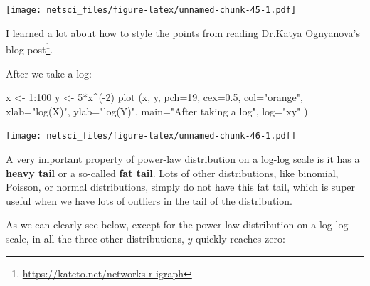 \documentclass[
]{krantz}
\makeatletter
\newenvironment{Shaded}{\begin{snugshade}}{\end{snugshade}}
\newcommand{\AttributeTok}[1]{\textcolor[rgb]{0.61,0.61,0.61}{#1}}
\newcommand{\DecValTok}[1]{\textcolor[rgb]{0.06,0.06,0.06}{#1}}
\newcommand{\FloatTok}[1]{\textcolor[rgb]{0.06,0.06,0.06}{#1}}
\newcommand{\FunctionTok}[1]{\textcolor[rgb]{0,0,0}{#1}}
\newcommand{\NormalTok}[1]{#1}
\newcommand{\OtherTok}[1]{\textcolor[rgb]{0.37,0.37,0.37}{#1}}
\newcommand{\SpecialCharTok}[1]{\textcolor[rgb]{0,0,0}{#1}}
\newcommand{\StringTok}[1]{\textcolor[rgb]{0.5,0.5,0.5}{#1}}
\renewcommand{\href}[2]{#2\footnote{\url{#1}}}
\newenvironment{kframe}{%
\medskip{}
\setlength{\fboxsep}{.8em}
 \def\at@end@of@kframe{}%
 \ifinner\ifhmode%
  \def\at@end@of@kframe{\end{minipage}}%
  \begin{minipage}{\columnwidth}%
 \fi\fi%
 \def\FrameCommand##1{\hskip\@totalleftmargin \hskip-\fboxsep
 \colorbox{shadecolor}{##1}\hskip-\fboxsep
     \hskip-\linewidth \hskip-\@totalleftmargin \hskip\columnwidth}%
 \MakeFramed {\advance\hsize-\width
   \@totalleftmargin\z@ \linewidth\hsize
   \@setminipage}}%
 {\par\unskip\endMakeFramed%
 \at@end@of@kframe}
\renewenvironment{Shaded}{\begin{kframe}}{\end{kframe}}
\makeatother
\begin{document}
\texttt{[image: netsci\_files/figure-latex/unnamed-chunk-45-1.pdf]}

I learned a lot about how to style the points from reading \href{https://kateto.net/networks-r-igraph}{Dr.Katya Ognyanova's blog post}.

After we take a log:

\begin{Shaded}
\begin{Highlighting}[]
\NormalTok{x }\OtherTok{\textless{}{-}} \DecValTok{1}\SpecialCharTok{:}\DecValTok{100}
\NormalTok{y }\OtherTok{\textless{}{-}} \DecValTok{5}\SpecialCharTok{*}\NormalTok{x}\SpecialCharTok{\^{}}\NormalTok{(}\SpecialCharTok{{-}}\DecValTok{2}\NormalTok{)}
\FunctionTok{plot}\NormalTok{ (x, y, }\AttributeTok{pch=}\DecValTok{19}\NormalTok{, }\AttributeTok{cex=}\FloatTok{0.5}\NormalTok{, }\AttributeTok{col=}\StringTok{"orange"}\NormalTok{,}
      \AttributeTok{xlab=}\StringTok{"log(X)"}\NormalTok{, }\AttributeTok{ylab=}\StringTok{"log(Y)"}\NormalTok{,}
      \AttributeTok{main=}\StringTok{"After taking a log"}\NormalTok{,}
      \AttributeTok{log=}\StringTok{"xy"}
\NormalTok{      )}
\end{Highlighting}
\end{Shaded}

\texttt{[image: netsci\_files/figure-latex/unnamed-chunk-46-1.pdf]}

A very important property of power-law distribution on a log-log scale is it has a \textbf{heavy tail} or a so-called \textbf{fat tail}. Lots of other distributions, like binomial, Poisson, or normal distributions, simply do not have this fat tail, which is super useful when we have lots of outliers in the tail of the distribution.

As we can clearly see below, except for the power-law distribution on a log-log scale, in all the three other distributions, \(y\) quickly reaches zero:
\end{document}
